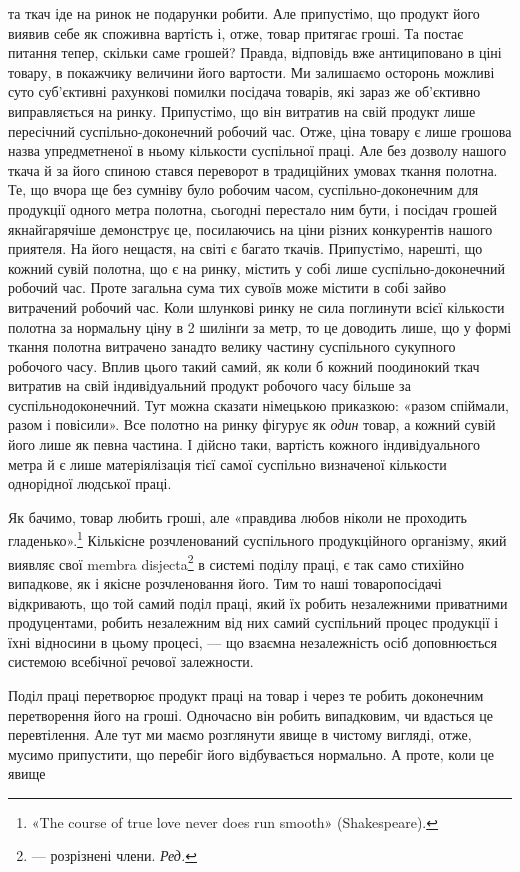 \parcont{}  %
та ткач іде на ринок не подарунки робити. Але припустімо, що
продукт його виявив себе як споживна вартість і, отже, товар
притягає гроші. Та постає питання тепер, скільки саме грошей?
Правда, відповідь вже антициповано в ціні товару, в покажчику
величини його вартости. Ми залишаємо осторонь можливі суто
суб’єктивні рахункові помилки посідача товарів, які зараз же
об’єктивно виправляється на ринку. Припустімо, що він витратив
на свій продукт лише пересічний суспільно-доконечний
робочий час. Отже, ціна товару є лише грошова назва упредметненої
в ньому кількости суспільної праці. Але без дозволу нашого
ткача й за його спиною стався переворот в традиційних умовах
ткання полотна. Те, що вчора ще без сумніву було робочим часом,
суспільно-доконечним для продукції одного метра полотна,
сьогодні перестало ним бути, і посідач грошей якнайгарячіше
демонструє це, посилаючись на ціни різних конкурентів нашого
приятеля. На його нещастя, на світі є багато ткачів. Припустімо,
нарешті, що кожний сувій полотна, що є на ринку, містить у
собі лише суспільно-доконечний робочий час. Проте загальна
сума тих сувоїв може містити в собі зайво витрачений робочий
час. Коли шлункові ринку не сила поглинути всієї кількости
полотна за нормальну ціну в 2 шилінґи за метр, то це доводить
лише, що у формі ткання полотна витрачено занадто велику
частину суспільного сукупного робочого часу. Вплив цього
такий самий, як коли б кожний поодинокий ткач витратив на
свій індивідуальний продукт робочого часу більше за суспільнодоконечний.
Тут можна сказати німецькою приказкою: «разом
спіймали, разом і повісили». Все полотно на ринку фігурує як
\emph{один} товар, а кожний сувій його лише як певна частина. І дійсно
таки, вартість кожного індивідуального метра й є лише матеріялізація
тієї самої суспільно визначеної кількости однорідної
людської праці.

Як бачимо, товар любить гроші, але «правдива любов ніколи
не проходить гладенько».\footnote*{
«The course of true love never does run smooth» (Shakespeare).
} Кількісне розчленований суспільного
продукційного організму, який виявляє свої membra disjecta\footnote*{
— розрізнені члени. \emph{Ред.}
}
в системі поділу праці, є так само стихійно випадкове, як і якісне
розчленовання його. Тим то наші товаропосідачі відкривають, що
той самий поділ праці, який їх робить незалежними приватними
продуцентами, робить незалежним від них самий суспільний процес
продукції і їхні відносини в цьому процесі, — що взаємна
незалежність осіб доповнюється системою всебічної речової залежности.

Поділ праці перетворює продукт праці на товар і через те
робить доконечним перетворення його на гроші. Одночасно він
робить випадковим, чи вдасться це перевтілення. Але тут ми маємо
розглянути явище в чистому вигляді, отже, мусимо припустити,
що перебіг його відбувається нормально. А проте, коли це явище
\parbreak{}  %
